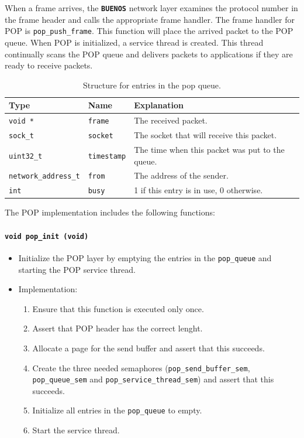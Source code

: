 \documentclass[twoside,a4paper]{report}
\makeatletter
\newcommand{\PBS}[1]{\let\temp=\\#1\let\\=\temp}
\newlength{\tablewidth}
\newenvironment{function}[3]{%
\paragraph{\texttt{#1 {\textbf{#2}} (#3)}}%
\index{#2@\texttt{#2}}%
\begin{itemize}%
}{%
\end{itemize}%
}
\newenvironment{structdescription}{%
\begin{center}%
\begin{tabular}{p{3.5cm}|p{2.5cm}|>{\PBS\raggedright}p{\tablewidth-6\tabcolsep-6cm}}%
\textbf{Type} & \textbf{Name} & \textbf{Explanation} \\ %
}{%
\end{tabular}%
\end{center}%
}
\newcommand{\structfield}[3]{%
\hline%
\texttt{#1} & \texttt{#2} & #3 \\%
}
\newcommand{\buenos}{\texttt{\textbf{BUENOS}}}
\makeatother
\begin{document}
When a frame arrives, the \buenos{} network layer examines the
protocol number in the frame header and calls the appropriate frame
handler. The frame handler for POP is
\texttt{pop\_push\_frame}.
This function will place the arrived packet to the POP queue. When POP
is initialized, a service thread is created. This thread continually
scans the POP queue and delivers packets to applications if they are
ready to receive packets.

\begin{table}
\begin{center}

\begin{structdescription}
\structfield{void *}{frame}{The received packet.}
\structfield{sock\_t}{socket}{The socket that will receive this packet.}
\structfield{uint32\_t}{timestamp}{The time when this packet was put
  to the queue.}
\structfield{network\_address\_t}{from}{The address of the sender.}
\structfield{int}{busy}{1 if this entry is in use, 0 otherwise.}
\end{structdescription}

\end{center}
\caption{Structure for entries in the pop queue.}
\label{tab:popqueue}
\end{table}

The POP implementation includes the following functions:

\begin{function}{void}{pop\_init}{void}
\item Initialize the POP layer by emptying the entries in the
\texttt{pop\_queue} and starting the POP service thread.

\item Implementation:
\begin{enumerate}
\item Ensure that this function is executed only once.
\item Assert that POP header has the correct lenght.
\item Allocate a page for the send buffer and assert that this
succeeds.
\item Create the three needed semaphores
  (\texttt{pop\_send\_buffer\_sem}, \\\texttt{pop\_queue\_sem} and
  \texttt{pop\_service\_thread\_sem}) and assert that this succeeds.
\item Initialize all entries in the \texttt{pop\_queue} to empty.
\item Start the service thread.
\end{enumerate}
\end{function}
\end{document}
